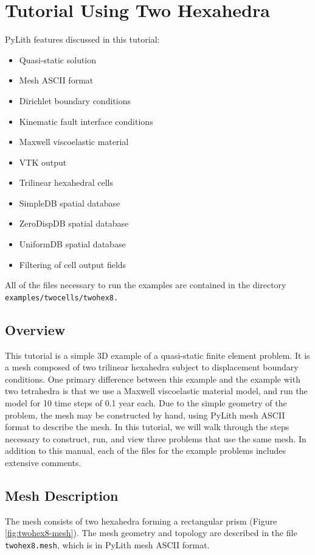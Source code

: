 
\section{\label{sec:Tutorial-Two-hexahedra}Tutorial Using Two Hexahedra}

PyLith features discussed in this tutorial:
\begin{itemize}
\item Quasi-static solution
\item Mesh ASCII format
\item Dirichlet boundary conditions
\item Kinematic fault interface conditions
\item Maxwell viscoelastic material
\item VTK output
\item Trilinear hexahedral cells
\item SimpleDB spatial database
\item ZeroDispDB spatial database
\item UniformDB spatial database
\item Filtering of cell output fields
\end{itemize}
All of the files necessary to run the examples are contained in the
directory \texttt{examples/twocells/twohex8.}


\subsection{Overview}

This tutorial is a simple 3D example of a quasi-static finite element
problem. It is a mesh composed of two trilinear hexahedra subject
to displacement boundary conditions. One primary difference between
this example and the example with two tetrahedra is that we use a
Maxwell viscoelastic material model, and run the model for 10 time
steps of 0.1 year each. Due to the simple geometry of the problem,
the mesh may be constructed by hand, using PyLith mesh ASCII format
to describe the mesh. In this tutorial, we will walk through the steps
necessary to construct, run, and view three problems that use the
same mesh. In addition to this manual, each of the files for the example
problems includes extensive comments.


\subsection{Mesh Description}

The mesh consists of two hexahedra forming a rectangular prism (Figure
\vref{fig:twohex8-mesh}). The mesh geometry and topology are described
in the file \texttt{twohex8.mesh}, which is in PyLith mesh ASCII format.

